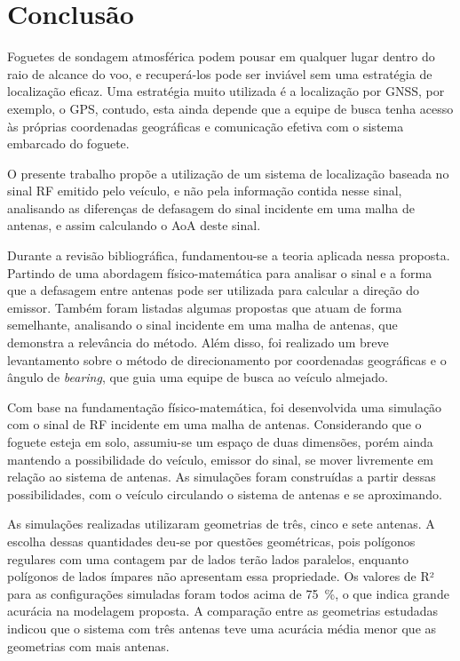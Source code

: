 \chapter{Conclusão}\label{cap:conclusao}

Foguetes de sondagem atmosférica podem pousar em qualquer lugar dentro do raio de alcance do voo, e recuperá-los pode ser inviável sem uma estratégia de localização eficaz.
Uma estratégia muito utilizada é a localização por \ac{GNSS}, por exemplo, o \ac{GPS}, contudo, esta ainda depende que a equipe de busca tenha acesso às próprias coordenadas geográficas e comunicação efetiva com o sistema embarcado do foguete.

O presente trabalho propõe a utilização de um sistema de localização baseada no sinal \ac{RF} emitido pelo veículo, e não pela informação contida nesse sinal, analisando as diferenças de defasagem do sinal incidente em uma malha de antenas, e assim calculando o \ac{AoA} deste sinal.

Durante a revisão bibliográfica, fundamentou-se a teoria aplicada nessa proposta.
Partindo de uma abordagem físico-matemática para analisar o sinal e a forma que a defasagem entre antenas pode ser utilizada para calcular a direção do emissor.
Também foram listadas algumas propostas que atuam de forma semelhante, analisando o sinal incidente em uma malha de antenas, que demonstra a relevância do método.
Além disso, foi realizado um breve levantamento sobre o método de direcionamento por coordenadas geográficas e o ângulo de \textit{bearing}, que guia uma equipe de busca ao veículo almejado.

Com base na fundamentação físico-matemática, foi desenvolvida uma simulação com o sinal de \ac{RF} incidente em uma malha de antenas.
Considerando que o foguete esteja em solo, assumiu-se um espaço de duas dimensões, porém ainda mantendo a possibilidade do veículo, emissor do sinal, se mover livremente em relação ao sistema de antenas.
As simulações foram construídas a partir dessas possibilidades, com o veículo circulando o sistema de antenas e se aproximando.

As simulações realizadas utilizaram geometrias de três, cinco e sete antenas.
A escolha dessas quantidades deu-se por questões geométricas, pois polígonos regulares com uma contagem par de lados terão lados paralelos, enquanto polígonos de lados ímpares não apresentam essa propriedade.
Os valores de R² para as configurações simuladas foram todos acima de \qty{75}{\percent}, o que indica grande acurácia na modelagem proposta.
A comparação entre as geometrias estudadas indicou que o sistema com três antenas teve uma acurácia média menor que as geometrias com mais antenas.

